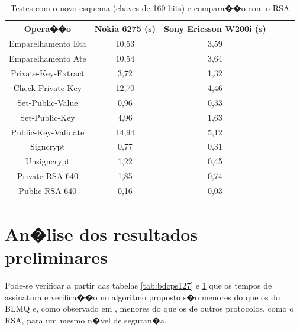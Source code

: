 \documentclass[a4paper,capchap,espacoduplo,normaltoc]{abntepusp}
\begin{document}
\begin{table}[h]\centering
\caption{Testes com o novo esquema (chaves de 160 bits) e compara��o com o RSA}\label{tab:bdcps160}
\begin{tabular}{cccccc}\hline
Opera��o                   & Nokia 6275 (s)   &  Sony Ericsson W200i (s) \\\hline
Emparelhamento Eta         & 10,53                  &  3,59                          \\\hline
Emparelhamento Ate         & 10,54                  &  3,64                          \\\hline
Private-Key-Extract        & 3,72                   &  1,32                          \\\hline
Check-Private-Key          & 12,70                  &  4,46                          \\\hline
Set-Public-Value           & 0,96                   &  0,33                          \\\hline
Set-Public-Key             & 4,96                   &  1,63                          \\\hline
Public-Key-Validate        & 14,94                  &  5,12                          \\\hline
Signcrypt                  & 0,77                   &  0,31                          \\\hline
Unsigncrypt                & 1,22                   &  0,45                          \\\hline
Private RSA-640            & 1,85                   &  0,74                          \\\hline
Public RSA-640             & 0,16                   &  0,03                          \\\hline
\end{tabular}
\end{table}

\section{An�lise dos resultados preliminares} 

Pode-se verificar a partir das tabelas \ref{tab:bdcps127} e \ref{tab:bdcps160} que os tempos de assinatura e verifica��o no algoritmo proposto s�o menores do que os do BLMQ e, como observado em \cite{bdcps}, menores do que os de outros protocolos, como o RSA, para um mesmo n�vel de seguran�a.
\end{document}

